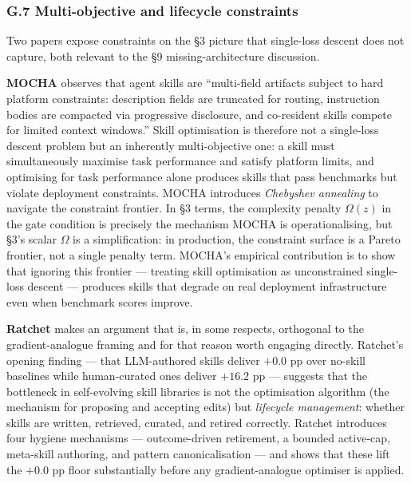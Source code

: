 \subsubsection{G.7 Multi-objective and lifecycle
constraints}\label{g.7-multi-objective-and-lifecycle-constraints}

Two papers expose constraints on the §3 picture that single-loss descent
does not capture, both relevant to the §9 missing-architecture
discussion.

\textbf{MOCHA} \citep{tanjim2026mocha} observes that agent skills are
``multi-field artifacts subject to hard platform constraints:
description fields are truncated for routing, instruction bodies are
compacted via progressive disclosure, and co-resident skills compete for
limited context windows.'' Skill optimisation is therefore not a
single-loss descent problem but an inherently multi-objective one: a
skill must simultaneously maximise task performance and satisfy platform
limits, and optimising for task performance alone produces skills that
pass benchmarks but violate deployment constraints. MOCHA introduces
\emph{Chebyshev annealing} to navigate the constraint frontier. In §3
terms, the complexity penalty \(\Omega(z)\) in the gate condition is
precisely the mechanism MOCHA is operationalising, but §3's scalar
\(\Omega\) is a simplification: in production, the constraint surface is
a Pareto frontier, not a single penalty term. MOCHA's empirical
contribution is to show that ignoring this frontier --- treating skill
optimisation as unconstrained single-loss descent --- produces skills
that degrade on real deployment infrastructure even when benchmark
scores improve.

\textbf{Ratchet} \citep{zhang2026ratchet} makes an argument that is, in
some respects, orthogonal to the gradient-analogue framing and for that
reason worth engaging directly. Ratchet's opening finding --- that
LLM-authored skills deliver \(+0.0\) pp over no-skill baselines while
human-curated ones deliver \(+16.2\) pp --- suggests that the bottleneck
in self-evolving skill libraries is not the optimisation algorithm (the
mechanism for proposing and accepting edits) but \emph{lifecycle
management}: whether skills are written, retrieved, curated, and retired
correctly. Ratchet introduces four hygiene mechanisms --- outcome-driven
retirement, a bounded active-cap, meta-skill authoring, and pattern
canonicalisation --- and shows that these lift the \(+0.0\) pp floor
substantially before any gradient-analogue optimiser is applied.


